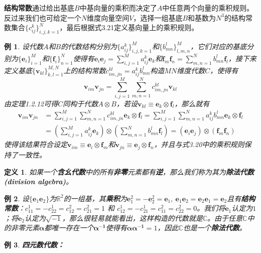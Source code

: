 \documentclass[mathserif,hyperref,UTF8,openany,b5paper]{ctexbook}
\newtheorem{exmp}{例}[section]
\newtheorem{defn}{定义}[section]
\begin{document}
\textbf{结构常数}通过给出基底$B$中基向量的乘积而决定了$A$中任意两个向量的乘积规则。反过来我们也可给定一个$N$维度向量空间$V$，选择一组基底$B$和基数为$N^3$的结构常数集合$\{c_{ij}^k\}_{i,j,k=1}^N$，最后根据式3.21定义基向量上的乘积规则。
\begin{exmp}
设代数$A$和$B$的代数结构分别为$\{a_{ij}^k\}^M_{i,j,k=1}$和$\{b^l_{mn}\}^M_{l,m,n}$，它们对应的基底分别为$\{\mathbf{e}_i\}^M_{i=1}$和$\{\mathbf{f}_i\}^N_{n=1}$使得有$\mathbf{e}_i\mathbf{e}_j=\sum^M_{i,j=1}a^k_{ij}\mathbf{e}_k$和$\mathbf{f}_m\mathbf{f}_n=\sum^N_{m,n=1}b^l_{mn}\mathbf{f}_l$，接下来定义基底$\{\mathbf{v}_{kl}\}^{M,N}_{k,l=1}$上的结构常数$c^{kl}_{im,jn}=a^k_{ij}b^l_{mn}$构造$MN$维度代数$C$，使得有
\begin{equation}
\mathbf{v}_{im}\mathbf{v}_{jn}=\sum^M_{i,j=1}\sum^N_{m,n=1}c^{kl}_{im,jn}\mathbf{v}_{kl}
\end{equation}
由定理1.2.12可得$C$同构于代数$A\otimes B$，若设$\mathbf{v}_{kl}\equiv\mathbf{e}_k\otimes\mathbf{f}_l$，那么就有
\begin{align}
\mathbf{v}_{im}\mathbf{v}_{jn}&=\sum^M_{i,j=1}\sum^N_{m,n=1}c^{kl}_{im,jn}\mathbf{e}_k\otimes\mathbf{f}_l=\sum^M_{i,j=1}\sum^N_{m,n=1}a^k_{ij}b^l_{mn}\mathbf{e}_k\otimes\mathbf{f}_l\\
&=\left (\sum^M_{i,j=1}a^k_{ij}\mathbf{e}_k\right)\otimes\left (\sum^N_{m,n=1}b^l_{mn}\mathbf{f}_l \right)=(\mathbf{e}_i\mathbf{e}_j)\otimes(\mathbf{f}_m\mathbf{f}_n)
\end{align}
使得该结果符合设定$\mathbf{v}_{im}\equiv\mathbf{e}_i\otimes\mathbf{f}_m$和$\mathbf{v}_{jn}\equiv\mathbf{e}_j\otimes\mathbf{f}_n$，并且与式3.20中的乘积规则保持了一致性。
\end{exmp}
\begin{defn}
如果一个\textbf{含幺代数}中的所有\textbf{非零}元素都有\textbf{逆}，那么我们称为其为\textbf{除法代数(division algebra)}。
\end{defn}
\begin{exmp}
设$\{\mathbf{e}_1\mathbf{e}_2\}$为$\mathbb{R}^2$的一组基，其\textbf{乘积}为$\mathbf{e}_1^2=-\mathbf{e}_2^2=\mathbf{e}_1,\ \mathbf{e}_1\mathbf{e}_2=\mathbf{e}_2\mathbf{e}_1=\mathbf{e}_2$且有\textbf{结构常数}：$ c_ {11}^ {1}  = - c_ {22}^ {1}  =  c_ {12}^ {2}  =  c_ {21}^ {2}  =1$ 和 $ c_ {12}^ {1}  = - c_ {21}^ {1}  =  c_ {11}^ {2} =  c_ {22}^ {2}  =0$。我们将$\mathbf{e}_1$认定为$1$；将$\mathbf{e}_2$认定为$\sqrt{-1}$，那么很轻易就能看出，这样构造的代数就是$\mathbb{C}$。由于任意$\mathbb{C}$中的非零元素$\boldsymbol{\alpha}$都唯一存在一个$\boldsymbol{\alpha^{-1}}$使得有$\boldsymbol{\alpha}\boldsymbol{\alpha^{-1}}=1$，因此$\mathbb{C}$也是一个\textbf{除法代数}。
\end{exmp}
\begin{exmp}\textbf{四元数代数：}\end{exmp}
\end{document}

